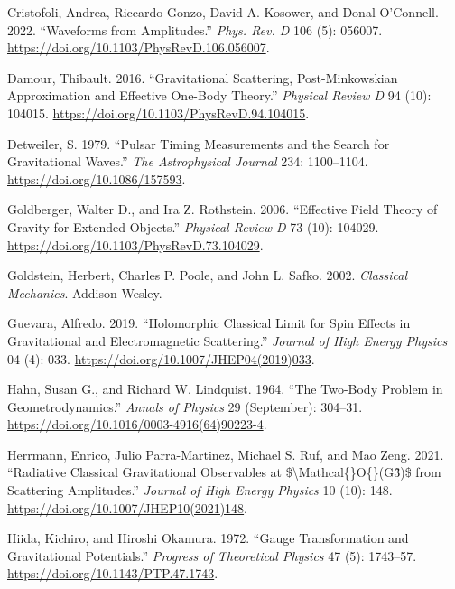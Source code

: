 \documentclass[
  11pt,
  a4paper,
  DIV=11,
  numbers=noendperiod,
  oneside]{scrreprt}
\newlength{\cslhangindent}
\newlength{\cslentryspacingunit} %
\newenvironment{CSLReferences}[2] %
 {%
  \setlength{\parindent}{0pt}
  \ifodd #1
  \let\oldpar\par
  \def\par{\hangindent=\cslhangindent\oldpar}
  \fi
  \setlength{\parskip}{#2\cslentryspacingunit}
 }%
 {}
\DeclareRobustCommand{\[}{\begin{equation}}
\DeclareRobustCommand{\]}{\end{equation}}
\begin{document}
\begin{CSLReferences}{1}{0}
\leavevmode{}%
Cristofoli, Andrea, Riccardo Gonzo, David A. Kosower, and Donal
O'Connell. 2022. {``Waveforms from Amplitudes.''} \emph{Phys. Rev. D}
106 (5): 056007. \url{https://doi.org/10.1103/PhysRevD.106.056007}.

\leavevmode{}%
Damour, Thibault. 2016. {``Gravitational Scattering, Post-{Minkowskian}
Approximation and {Effective One-Body} Theory.''} \emph{Physical Review
D} 94 (10): 104015. \url{https://doi.org/10.1103/PhysRevD.94.104015}.

\leavevmode{}%
Detweiler, S. 1979. {``Pulsar Timing Measurements and the Search for
Gravitational Waves.''} \emph{The Astrophysical Journal} 234:
1100--1104. \url{https://doi.org/10.1086/157593}.

\leavevmode{}%
Goldberger, Walter D., and Ira Z. Rothstein. 2006. {``Effective Field
Theory of Gravity for Extended Objects.''} \emph{Physical Review D} 73
(10): 104029. \url{https://doi.org/10.1103/PhysRevD.73.104029}.

\leavevmode{}%
Goldstein, Herbert, Charles P. Poole, and John L. Safko. 2002.
\emph{Classical {Mechanics}}. {Addison Wesley}.

\leavevmode{}%
Guevara, Alfredo. 2019. {``Holomorphic {Classical Limit} for {Spin
Effects} in {Gravitational} and {Electromagnetic Scattering}.''}
\emph{Journal of High Energy Physics} 04 (4): 033.
\url{https://doi.org/10.1007/JHEP04(2019)033}.

\leavevmode{}%
Hahn, Susan G., and Richard W. Lindquist. 1964. {``The Two-Body Problem
in Geometrodynamics.''} \emph{Annals of Physics} 29 (September):
304--31. \url{https://doi.org/10.1016/0003-4916(64)90223-4}.

\leavevmode{}%
Herrmann, Enrico, Julio Parra-Martinez, Michael S. Ruf, and Mao Zeng.
2021. {``Radiative Classical Gravitational Observables at
\$\textbackslash Mathcal\{\vphantom\}{O}\vphantom\{\}({G}3̂)\$ from
Scattering Amplitudes.''} \emph{Journal of High Energy Physics} 10 (10):
148. \url{https://doi.org/10.1007/JHEP10(2021)148}.

\leavevmode{}%
Hiida, Kichiro, and Hiroshi Okamura. 1972. {``Gauge {Transformation} and
{Gravitational Potentials}.''} \emph{Progress of Theoretical Physics} 47
(5): 1743--57. \url{https://doi.org/10.1143/PTP.47.1743}.


\end{CSLReferences}
\end{document}
